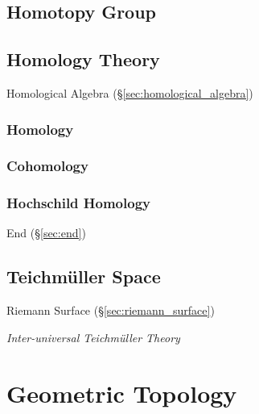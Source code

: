 \subsection{Homotopy Group}\label{sec:homotopy_group}

\subsection{Homology Theory}\label{sec:homology_theory}

Homological Algebra (\S\ref{sec:homological_algebra})



\subsubsection{Homology}\label{sec:homology}

\subsubsection{Cohomology}\label{sec:cohomology}

\subsubsection{Hochschild Homology}\label{sec:hochschild_homology}

End (\S\ref{sec:end})



\subsection{Teichm\"uller Space}\label{sec:teichmuller_space}

Riemann Surface (\S\ref{sec:riemann_surface})

\emph{Inter-universal Teichm\"uller Theory} %



\section{Geometric Topology}\label{sec:geometric_topology}


